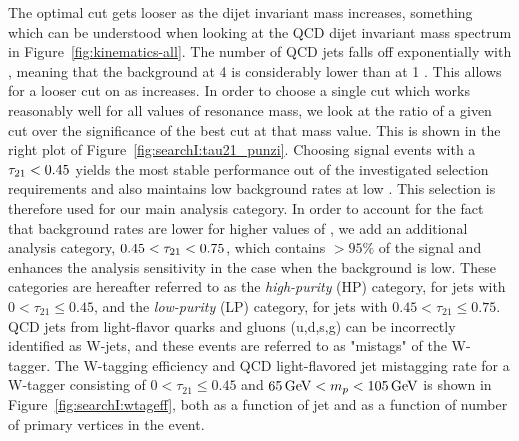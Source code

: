 The optimal cut gets looser as the dijet invariant mass increases, something which can be understood when looking at the QCD dijet invariant mass spectrum in Figure~\ref{fig:kinematics-all}. The number of QCD jets falls off exponentially with \mjj, meaning that the background at 4 \TeV is considerably lower than at 1 \TeV. This allows for a looser cut on \nsubj as \mjj increases. In order to choose a single cut which works reasonably well for all values of resonance mass, we look at the ratio of a given \nsubj cut over the significance of the best cut at that mass value. This is shown in the right plot of Figure~\ref{fig:searchI:tau21_punzi}. Choosing signal events with a $\tau_{21} < 0.45$ yields the most stable performance out of the investigated \nsubj selection requirements and also maintains low background rates at low \mjj. This selection is therefore used for our main analysis category. In order to account for the fact that background rates are lower for higher values of \mjj, we add an additional analysis category, $0.45 < \tau_{21} < 0.75$, which contains $>95\%$ of the signal and enhances the analysis sensitivity in the case when the background is low. These categories are hereafter referred to as the \emph{high-purity} (HP) category, for jets with $0<\tau_{21} \leq 0.45$, and the \emph {low-purity} (LP) category, for jets with $0.45<\tau_{21}\leq0.75$. QCD jets from light-flavor quarks and gluons (u,d,s,g) can be incorrectly identified as W-jets, and these events are referred to as "mistags" of the W-tagger. The W-tagging efficiency and QCD light-flavored jet mistagging rate for a W-tagger consisting of $0<\tau_{21} \leq 0.45$ and  $65 \,\text{Ge\hspace{-.08em}V} < m_{p} < 105 \,\text{Ge\hspace{-.08em}V}$ is shown in Figure~\ref{fig:searchI:wtageff}, both as a function of jet \PT and as a function of number of primary vertices in the event.
